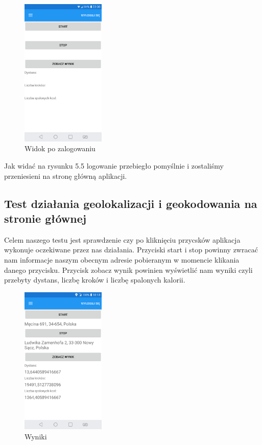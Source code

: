 \begin{figure}[!htb]
	\begin{center}
		\includegraphics[width=4cm]{rys/ZZsg.png}
		\caption{Widok po zalogowaniu}
		\label{rys:rysunek033}
	\end{center}
\end{figure}

Jak widać na rysunku 5.5 logowanie przebiegło pomyślnie i zostaliśmy przeniesieni na stronę główną aplikacji.

\subsection{Test działania geolokalizacji i geokodowania na stronie głównej}

\hspace{1cm} Celem naszego testu jest sprawdzenie czy po kliknięciu przycsków aplikacja wykonuje oczekiwane przez nas działania. Przyciski start i stop powinny zwracać nam informacje naszym obecnym adresie pobieranym w momencie klikania danego przycisku. Przycisk zobacz wynik powinien wyświetlić nam wyniki czyli przebyty dystans, liczbę kroków i liczbę spalonych kalorii.

\begin{figure}[!htb]
	\begin{center}
		\includegraphics[width=4cm]{rys/ZZZ.png}
		\caption{Wyniki}
		\label{rys:rysunek034}
	\end{center}
\end{figure}

